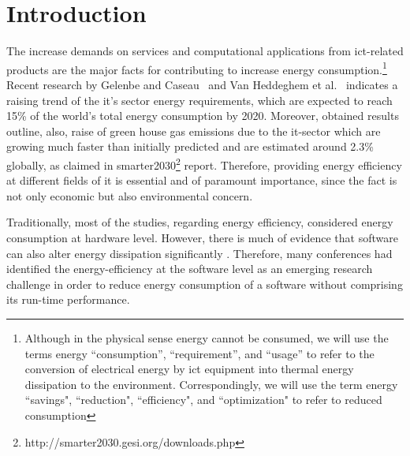 \section{Introduction}
The increase demands on services and computational applications 
from {\sc ict}-related products are the major facts for contributing 
to increase energy consumption.{\footnote{Although in the physical sense energy 
		cannot be consumed, we will use the terms energy ``consumption'', 
		``requirement'', and ``usage'' to refer to the conversion of 
		electrical energy by {\sc ict} equipment into thermal energy 
		dissipation to the environment. 
		Correspondingly, we will use the term energy ``savings", 
		``reduction", ``efficiency", and ``optimization" to refer 
		to reduced consumption}} 
Recent research by Gelenbe and Caseau~ and 
Van Heddeghem et al.~ indicates a 
raising trend of the {\sc it}'s sector energy requirements, which are 
expected to reach 15\% of the world's total energy consumption 
by 2020. 
Moreover, obtained results outline, also, raise of green house gas 
emissions due to the {\sc it}-sector which are growing much faster 
than initially predicted and are estimated around 2.3\% globally, as 
claimed in {\sc smart}er2030\footnote{http://smarter2030.gesi.org/downloads.php} 
report.
Therefore, providing energy efficiency at different fields of 
{\sc it} is essential and of paramount importance, since the fact 
is not only economic but also environmental concern. 

Traditionally, most of the studies, regarding energy efficiency, 
considered energy consumption at hardware level. 
However, there is much of evidence that software can also 
alter energy dissipation significantly \cite{eder_energy_consumptions, 
capra_is_2012, ferreira_seflab_2013}. 
Therefore, many conferences had identified the energy-efficiency 
at the software level as an emerging research challenge in order 
to reduce energy consumption of a software without comprising its 
run-time performance.




